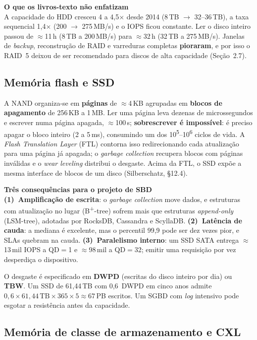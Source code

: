 \documentclass[11pt,a4paper]{article}
\newcommand{\destaque}[2]{%
  \begin{center}\begin{minipage}{0.97\textwidth}
  \colorbox{fundo}{\begin{minipage}{\dimexpr\linewidth-2\fboxsep}
  \vspace{3pt}\textbf{\color{azul}#1}\\[2pt]\small #2\vspace{3pt}
  \end{minipage}}\end{minipage}\end{center}}
\newcommand{\us}{\,\textmu s}
\begin{document}
\destaque{O que os livros-texto não enfatizam}{%
A capacidade do HDD cresceu 4 a 4,5$\times$ desde 2014 (8\,TB $\rightarrow$ 32--36\,TB), a
taxa sequencial 1,4$\times$ (200 $\rightarrow$ 275\,MB/s) e o IOPS ficou constante. Ler o disco
inteiro passou de $\approx$11\,h (8\,TB a 200\,MB/s) para $\approx$32\,h (32\,TB a
275\,MB/s). Janelas de \emph{backup}, reconstrução de RAID e varreduras completas
\textbf{pioraram}, e por isso o RAID~5 deixou de ser recomendado para discos de alta
capacidade (Seção~2.7).}

\subsection{Memória flash e SSD}

A NAND organiza-se em \textbf{páginas} de $\approx$4\,KB agrupadas em \textbf{blocos de
apagamento} de 256\,KB a 1\,MB. Ler uma página leva dezenas de microssegundos e escrever
numa página apagada, $\approx$100\us; \textbf{sobrescrever é impossível}: é preciso apagar o
bloco inteiro (2 a 5\,ms), consumindo um dos 10\textsuperscript{5}--10\textsuperscript{6}
ciclos de vida. A \emph{Flash Translation Layer} (FTL) contorna isso redirecionando cada
atualização para uma página já apagada; o \emph{garbage collection} recupera blocos com
páginas inválidas e o \emph{wear leveling} distribui o desgaste. Acima da FTL, o SSD expõe a
mesma interface de blocos de um disco (Silberschatz, §12.4).

\destaque{Três consequências para o projeto de SBD}{%
\textbf{(1)~Amplificação de escrita}: o \emph{garbage collection} move dados, e estruturas com
atualização no lugar (B\textsuperscript{+}-tree) sofrem mais que estruturas
\emph{append-only} (LSM-tree), adotadas por RocksDB, Cassandra e ScyllaDB.
\textbf{(2)~Latência de cauda}: a mediana é excelente, mas o percentil 99,9 pode ser dez
vezes pior, e SLAs quebram na cauda. \textbf{(3)~Paralelismo interno}: um SSD SATA entrega
$\approx$13\,mil IOPS a QD$=$1 e $\approx$98\,mil a QD$=$32; emitir uma requisição por vez
desperdiça o dispositivo.}

O desgaste é especificado em \textbf{DWPD} (escritas do disco inteiro por dia) ou
\textbf{TBW}. Um SSD de 61,44\,TB com 0,6~DWPD em cinco anos admite
$0{,}6 \times 61{,}44\,\text{TB} \times 365 \times 5 \approx 67$\,PB escritos. Um SGBD com
\emph{log} intensivo pode esgotar a resistência antes da capacidade.

\subsection{Memória de classe de armazenamento e CXL}
\end{document}
